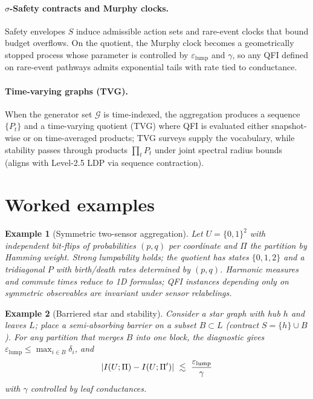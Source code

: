 \documentclass[11pt]{article}
\newcommand{\gap}{\gamma}             %
\newcommand{\1}{\mathbf{1}}
\DeclarePairedDelimiter{\abs}{\lvert}{\rvert}
\newtheorem{example}{Example}           %
\begin{document}
\paragraph{$\sigma$-Safety contracts and Murphy clocks.}
Safety envelopes $S$ induce admissible action sets and rare-event clocks that bound budget overflows.
On the quotient, the Murphy clock becomes a geometrically stopped process whose parameter is controlled by $\varepsilon_{\mathrm{lump}}$ and $\gap$, so any QFI defined on rare-event pathways admits exponential tails with rate tied to conductance. %

\paragraph{Time-varying graphs (TVG).}
When the generator set $\mathcal{G}$ is time-indexed, the aggregation produces a sequence $\{P_t\}$ and a time-varying quotient (TVG) where QFI is evaluated either snapshot-wise or on time-averaged products; TVG surveys\cite{TVGSurvey} supply the vocabulary, while stability passes through products $\prod_t P_t$ under joint spectral radius bounds (aligns with Level-2.5 LDP via sequence contraction). %

\section{Worked examples}
\begin{example}[Symmetric two-sensor aggregation]
Let $U=\{0,1\}^2$ with independent bit-flips of probabilities $(p,q)$ per coordinate and $\Pi$ the partition by Hamming weight.
Strong lumpability holds; the quotient has states $\{0,1,2\}$ and a tridiagonal $P$ with birth/death rates determined by $(p,q)$\cite{KemenySnell1960}.
Harmonic measures and commute times reduce to 1D formulas; QFI instances depending only on symmetric observables are invariant under sensor relabelings.
\end{example}

\begin{example}[Barriered star and stability]
Consider a star graph with hub $h$ and leaves $L$; place a semi-absorbing barrier on a subset $B\subset L$ (contract $S=\{h\}\cup B$).
For any partition that merges $B$ into one block, the diagnostic gives $\varepsilon_{\mathrm{lump}}\le \max_{i\in B}\delta_i$, and
\[
\abs{I(U;\Pi)-I(U;\Pi')}\ \lesssim\ \frac{\varepsilon_{\mathrm{lump}}}{\gap}
\]
with $\gap$ controlled by leaf conductances\cite{Chung1997,Dodziuk1984}.
\end{example}
\end{document}
